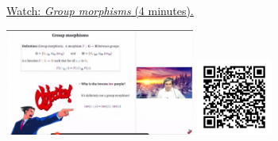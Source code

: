 
\begin{minipage}{10cm}
    \href{https://act4e-spring21.netlify.app/videos/spring2021-morphisms:morphisms:group-morphisms.html}{Watch: \emph{Group morphisms} (4 minutes).}
        
    \href{https://act4e-spring21.netlify.app/videos/spring2021-morphisms:morphisms:group-morphisms.html}{\includegraphics[height=3.5cm]{spring2021-morphisms:morphisms:group-morphisms/thumbnails.jpg}}
    \href{https://act4e-spring21.netlify.app/videos/spring2021-morphisms:morphisms:group-morphisms.html}{\includegraphics[height=2.5cm]{spring2021-morphisms:morphisms:group-morphisms/qrcode.png}}
\end{minipage}
